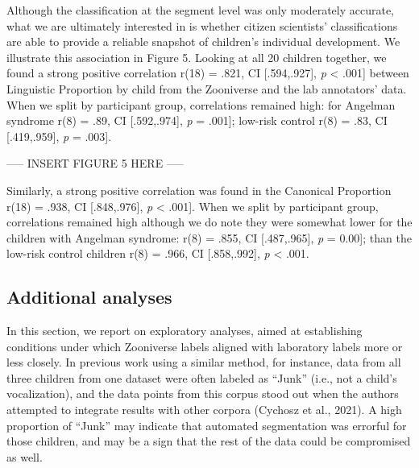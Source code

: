 \documentclass[
  english,
  ,man]{apa6}
\begin{document}
Although the classification at the segment level was only moderately accurate, what we are ultimately interested in is whether citizen scientists' classifications are able to provide a reliable snapshot of children's individual development. We illustrate this association in Figure 5. Looking at all 20 children together, we found a strong positive correlation r(18) = .821, CI {[}.594,.927{]}, \emph{p} \textless{} .001{]} between Linguistic Proportion by child from the Zooniverse and the lab annotators' data. When we split by participant group, correlations remained high: for Angelman syndrome r(8) = .89, CI {[}.592,.974{]}, \emph{p} = .001{]}; low-risk control r(8) = .83, CI {[}.419,.959{]}, \emph{p} = .003{]}.

----- INSERT FIGURE 5 HERE -----

Similarly, a strong positive correlation was found in the Canonical Proportion r(18) = .938, CI {[}.848,.976{]}, \emph{p} \textless{} .001{]}. When we split by participant group, correlations remained high although we do note they were somewhat lower for the children with Angelman syndrome: r(8) = .855, CI {[}.487,.965{]}, \emph{p} = 0.00{]}; than the low-risk control children r(8) = .966, CI {[}.858,.992{]}, \emph{p} \textless{} .001.

\hypertarget{additional-analyses}{%
\subsection{Additional analyses}\label{additional-analyses}}

In this section, we report on exploratory analyses, aimed at establishing conditions under which Zooniverse labels aligned with laboratory labels more or less closely. In previous work using a similar method, for instance, data from all three children from one dataset were often labeled as ``Junk'' (i.e., not a child's vocalization), and the data points from this corpus stood out when the authors attempted to integrate results with other corpora (Cychosz et al., 2021). A high proportion of ``Junk'' may indicate that automated segmentation was errorful for those children, and may be a sign that the rest of the data could be compromised as well.
\end{document}
